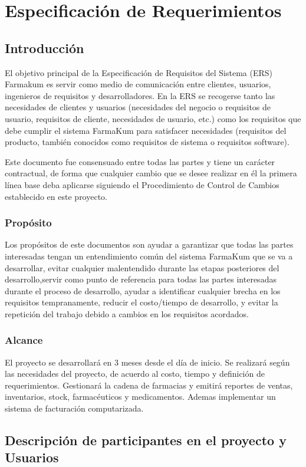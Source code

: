 \chapter*{Especificación de Requerimientos}
\section{Introducción}
El objetivo principal de la Especificación de Requisitos del Sistema (ERS) Farmakum es servir como medio de comunicación entre clientes, usuarios, ingenieros de requisitos y desarrolladores. En la ERS se recogerse tanto las necesidades de clientes y usuarios (necesidades del negocio o requisitos de usuario, requisitos de cliente, necesidades de usuario, etc.) como los requisitos que debe cumplir el sistema FarmaKum para satisfacer  necesidades (requisitos del producto, también conocidos como requisitos de sistema o requisitos software).

Este documento fue consensuado entre todas las partes y tiene un carácter contractual, de forma que cualquier cambio que se desee realizar en él la primera línea base deba aplicarse siguiendo el Procedimiento de Control de Cambios establecido en este proyecto.
\subsection{Propósito}
Los propósitos de este documentos son ayudar a garantizar que todas las partes interesadas tengan un entendimiento común del sistema FarmaKum que se va a desarrollar, evitar cualquier malentendido durante las etapas posteriores del desarrollo,servir como punto de referencia para todas las partes interesadas durante el proceso de desarrollo, ayudar a identificar cualquier brecha en los requisitos tempranamente, reducir el costo/tiempo de desarrollo, y evitar la repetición del trabajo debido a cambios en los requisitos acordados.
\subsection{Alcance}
El proyecto se desarrollará en 3 meses desde el día de inicio. Se realizará según las necesidades del proyecto, de acuerdo al costo,  tiempo y definición de requerimientos. Gestionará la cadena de farmacias y emitirá reportes de ventas, inventarios, stock, farmacéuticos y medicamentos\cite{ahmed_software_2012}.  Ademas implementar un sistema de facturación computarizada.
\section{Descripción de participantes en el proyecto y Usuarios}
